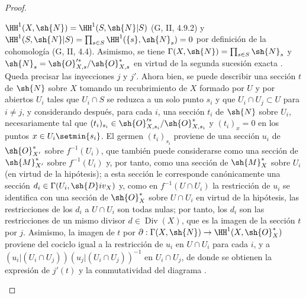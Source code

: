 \begin{proof}
\begin{enumerate}[label=(\roman*)]
$\HH^1(X,\sh{N})=\HH^1(S,\sh{N}|S)$ (G, II, 4.9.2) y $\HH^1(S,\sh{N}|S)=\prod_{s\in S}\HH^1(\{s\},\sh{N}_s)=0$
por definición de la cohomología (G, II, 4.4).
Asimismo, se tiene $\Gamma(X,\sh{N})=\prod_{s\in S}\sh{N}_s$ y $\sh{N}_s=\sh{O}'^{*}_{X,s}/\sh{O}^*_{X,s}$ en virtud de la segunda sucesión exacta .
Queda precisar las inyecciones $j$ y $j'$.
Ahora bien, se puede describir una sección $t$ de $\sh{N}$ sobre $X$ tomando un recubrimiento de $X$ formado por $U$ y por abiertos $U_i$ tales que $U_i\cap S$ se reduzca a un solo punto $s_i$ y que $U_i\cap U_j\subset U$ para $i\neq j$, y considerando después, para cada $i$, una sección $t_i$ de $\sh{N}$ sobre $U_i$, necesariamente tal que $(t_i)_{s_i}\in\sh{O}'^{*}_{X,s_i}/\sh{O}^*_{X,s_i}$ y $(t_i)_x=0$ en los puntos $x\in U_i\setmin\{s_i\}$.
El germen $(t_i)_{s_i}$ proviene de una sección $u_i$ de $\sh{O}^*_{X'}$ sobre $f^{-1}(U_i)$, que también puede considerarse como una sección de $\sh{M}^*_{X'}$ sobre $f^{-1}(U_i)$ y, por tanto, como una sección de $\sh{M}^*_X$ sobre $U_i$ (en virtud de la hipótesis);
a esta sección le corresponde canónicamente una sección $d_i\in\Gamma(U_i,\sh{D}iv_X)$ y, como en $f^{-1}(U\cap U_i)$ la restricción de $u_i$ se identifica con una sección de $\sh{O}^*_X$ sobre $U\cap U_i$ en virtud de la hipótesis, las restricciones de los $d_i$ a $U\cap U_i$ son todas nulas; por tanto, los $d_i$ son las restricciones de un mismo divisor $d\in\operatorname{Div}(X)$, que es la imagen de la sección $t$ por $j$.
Asimismo, la imagen de $t$ por $\partial:\Gamma(X,\sh{N})\to\HH^1(X,\sh{O}^*_X)$ proviene del cociclo igual a la restricción de $u_i$ en $U\cap U_i$ para cada $i$, y a $(u_i|(U_i\cap U_j))(u_j|(U_i\cap U_j))^{-1}$ en $U_i\cap U_j$, de donde se obtienen la expresión de $j'(t)$ y la conmutatividad del diagrama .
\end{enumerate}
\end{proof}

